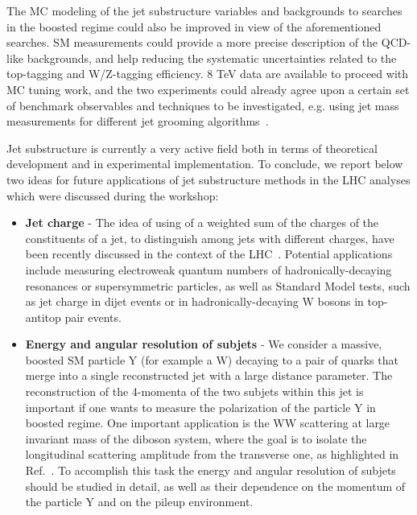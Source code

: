 \documentclass{PoS}
\begin{document}
The MC modeling of the jet substructure variables and backgrounds to searches in 
the boosted regime could also be improved in 
view of the aforementioned searches. 
SM measurements could provide a more precise description of the 
QCD-like backgrounds, and help reducing the systematic uncertainties 
related to the top-tagging and W/Z-tagging efficiency.
8 TeV data are available to proceed with MC tuning work, 
and the two experiments could already 
agree upon a certain set of benchmark observables and techniques to 
be investigated, e.g. using jet mass measurements 
for different jet grooming algorithms~\cite{Chatrchyan:2013rla,ATLAS:2012am}.

Jet substructure is currently a very active field both in terms of theoretical development and in experimental implementation.
To conclude, we report below two ideas for future applications of jet substructure methods in the LHC analyses which 
were discussed during the workshop:
\begin{itemize}
\item  {\bf Jet charge} - The idea of using of a weighted sum of the charges of the constituents of a jet, to distinguish 
among jets with different charges, have been recently discussed in the context of the LHC~\cite{Krohn:2012fg}.
Potential applications include measuring electroweak quantum
numbers of hadronically-decaying resonances or supersymmetric particles, as well as 
Standard Model tests, such as jet charge in dijet events or in hadronically-decaying W 
bosons in top-antitop pair events.
\item {\bf Energy and angular resolution of subjets} - We consider a massive, boosted SM particle Y (for example a W) 
decaying to a pair of quarks that merge into a single reconstructed jet with a large distance parameter. 
The reconstruction of the 4-momenta of the two subjets within this jet is important if one wants to 
measure the polarization of the particle Y in boosted regime. One important application is the WW scattering 
at large invariant mass of the diboson system, where the goal is to isolate the longitudinal scattering 
amplitude from the transverse one, as highlighted in Ref.~\cite{Han:2009em}.
To accomplish this task the energy and angular resolution of subjets 
should be studied in detail, as well as their dependence on the momentum of the particle Y and on the pileup environment. 
\end{itemize}
\end{document}
